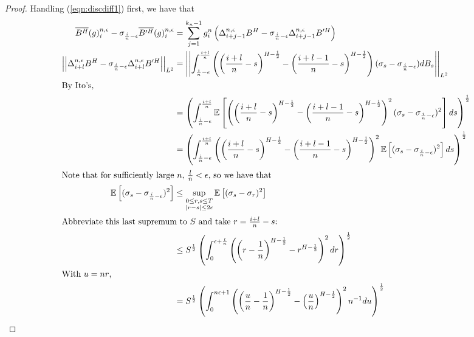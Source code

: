 \documentclass[12pt,letterpaper]{article}
\theoremstyle{definition}
\newcommand{\E}{\mathbb{E}}
\newcommand{\lpnorm}[2]{\left|\left|{#1}\right|\right|_{L^{#2}}}
\begin{document}
\begin{proof}
  Handling (\ref{eqn:discdiff1}) first, we have that
  \begin{align}
    \overline{B^{H}}(g)^{n,\epsilon}_i - \sigma_{\frac{i}{n}-\epsilon}\overline{B'^H}(g)^{n,\epsilon}_i &= \sum_{j=1}^{k_n-1}g^n_i\left( \Delta_{i+j-1}^{n,\epsilon}B^{H} - \sigma_{\frac{i}{n}-\epsilon}\Delta_{i+j-1}^{n,\epsilon}B'^H\right) \\
    \lpnorm{\Delta_{i+l}^{n,\epsilon}B^{H} - \sigma_{\frac{i}{n}-\epsilon}\Delta_{i+l}^{n,\epsilon}B'^H}{2} &= \lpnorm{\int_{\frac{i}{n} - \epsilon}^{\frac{i+l}{n}}\left( \left( \frac{i+l}{n} - s \right)^{H-\frac{1}{2}} - \left( \frac{i+l-1}{n} - s \right)^{H-\frac{1}{2}}\right) (\sigma_s - \sigma_{\frac{i}{n} - \epsilon})dB_s}{2} \\
    \intertext{By Ito's,}
                                                                                                   &= \left(\int_{\frac{i}{n} - \epsilon}^{\frac{i+l}{n}}\E\left[\left( \left( \frac{i+l}{n} - s \right)^{H-\frac{1}{2}} - \left( \frac{i+l-1}{n} - s \right)^{H-\frac{1}{2}}\right)^2 (\sigma_s - \sigma_{\frac{i}{n} - \epsilon})^2\right]ds\right)^{\frac{1}{2}} \\
                                                                                                   &= \left(\int_{\frac{i}{n} - \epsilon}^{\frac{i+l}{n}}\left( \left( \frac{i+l}{n} - s \right)^{H-\frac{1}{2}} - \left( \frac{i+l-1}{n} - s \right)^{H-\frac{1}{2}}\right)^2 \E\left[(\sigma_s - \sigma_{\frac{i}{n} - \epsilon})^2\right]ds\right)^{\frac{1}{2}} \\
    \intertext{Note that for sufficiently large \(n\), \(\frac{l}{n} < \epsilon\), so we have that}
    \E\left[(\sigma_s - \sigma_{\frac{i}{n} - \epsilon})^2\right] &\leq \sup_{\substack{0 \leq r,s \leq T \\ |r-s| \leq 2\epsilon}}\E\left[(\sigma_s - \sigma_r)^2\right] \\
    \intertext{Abbreviate this last supremum to \(S\) and take \(r = \frac{i+l}{n}-s\):}
                                                                                                   &\leq S^{\frac{1}{2}}\left(\int^{\epsilon+\frac{l}{n}}_0\left(\left(r - \frac{1}{n}\right)^{H-\frac{1}{2}} -  r^{H-\frac{1}{2}}\right)^2 dr\right)^{\frac{1}{2}} \\
    \intertext{With \(u = nr\),}
                                                                                                   &= S^{\frac{1}{2}}\left(\int^{n\epsilon+1}_0\left(\left(\frac{u}{n} - \frac{1}{n}\right)^{H-\frac{1}{2}} -  \left( \frac{u}{n} \right)^{H-\frac{1}{2}}\right)^2 n^{-1}du\right)^{\frac{1}{2}} \\

\end{align}
\end{proof}
\end{document}
